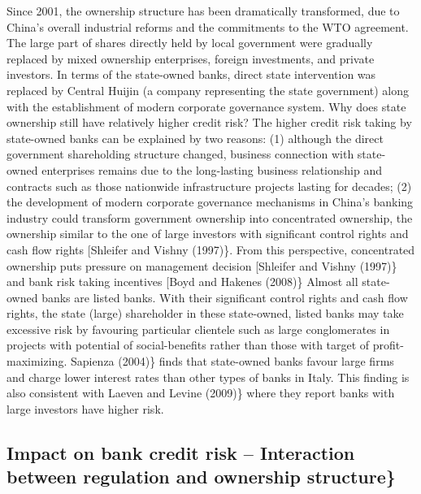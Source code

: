 \documentclass{article}
\begin{document}
Since 2001, the ownership structure has been dramatically transformed,
due to China's overall industrial reforms and the commitments to the WTO
agreement. The large part of shares directly held by local government
were gradually replaced by mixed ownership enterprises, foreign
investments, and private investors. In terms of the state-owned banks,
direct state intervention was replaced by Central Huijin (a company
representing the state government) along with the establishment of
modern corporate governance system. Why does state ownership still have
relatively higher credit risk? The higher credit risk taking by
state-owned banks can be explained by two reasons: (1) although the
direct government shareholding structure changed, business connection
with state-owned enterprises remains due to the long-lasting business
relationship and contracts such as those nationwide infrastructure
projects lasting for decades; (2) the development of modern corporate
governance mechanisms in China's banking industry could transform
government ownership into concentrated ownership, the ownership similar
to the one of large investors with significant control rights and cash
flow rights {[}Shleifer and Vishny (1997)\}. From this perspective,
concentrated ownership puts pressure on management decision {[}Shleifer
and Vishny (1997)\} and bank risk taking incentives {[}Boyd and Hakenes
(2008)\} Almost all state-owned banks are listed banks. With their
significant control rights and cash flow rights, the state (large)
shareholder in these state-owned, listed banks may take excessive risk
by favouring particular clientele such as large conglomerates in
projects with potential of social-benefits rather than those with target
of profit-maximizing. Sapienza (2004)\} finds that state-owned banks
favour large firms and charge lower interest rates than other types of
banks in Italy. This finding is also consistent with Laeven and Levine
(2009)\} where they report banks with large investors have higher risk.

\hypertarget{impact-on-bank-credit-risk-interaction-between-regulation-and-ownership-structure}{%
\subsection{Impact on bank credit risk -- Interaction between regulation
and ownership
structure\}}\label{impact-on-bank-credit-risk-interaction-between-regulation-and-ownership-structure}}

\begingroup\fontsize{7}{9}\selectfont
\end{document}
